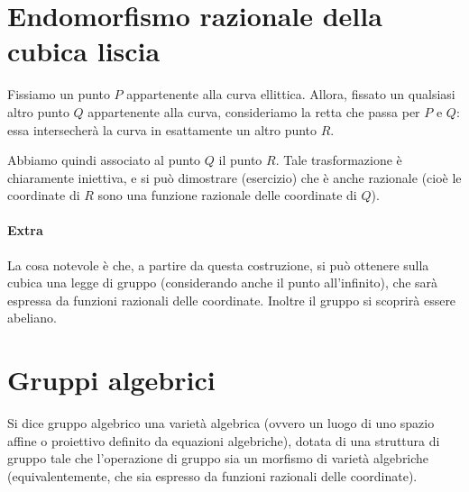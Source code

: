 \section{Endomorfismo razionale della cubica liscia}
Fissiamo un punto $P$ appartenente alla curva ellittica. Allora, fissato un qualsiasi altro punto $Q$ appartenente alla curva, consideriamo
la retta che passa per $P$ e $Q$: essa intersecherà la curva in esattamente un altro punto $R$.

Abbiamo quindi associato al punto $Q$ il punto $R$. Tale trasformazione è chiaramente iniettiva, e si può dimostrare (esercizio)
che è anche razionale (cioè le coordinate di $R$ sono una funzione razionale delle coordinate di $Q$).

\paragraph{Extra}
La cosa notevole è che, a partire da questa costruzione, si può ottenere sulla cubica una legge di gruppo (considerando anche il punto
all'infinito), che sarà espressa da funzioni razionali delle coordinate. Inoltre il gruppo si scoprirà essere abeliano.

\section{Gruppi algebrici}
\begin{definizione}
  Si dice gruppo algebrico una varietà algebrica (ovvero un luogo di uno spazio affine o proiettivo definito da equazioni algebriche),
  dotata di una struttura di gruppo tale che l'operazione di gruppo sia un morfismo di varietà algebriche (equivalentemente, che sia
  espresso da funzioni razionali delle coordinate).
\end{definizione}

